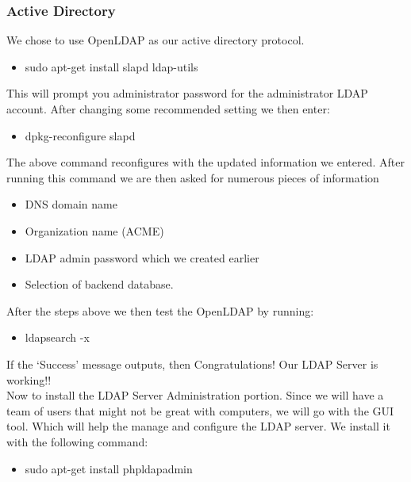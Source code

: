 \subsubsection{Active Directory}
We chose to use OpenLDAP as our active directory protocol.

\begin{itemize}
	
	\item sudo apt-get install slapd ldap-utils
	
\end{itemize}

\noindent This will prompt you administrator password for the administrator LDAP 
account.
After changing some recommended setting we then enter:

\begin{itemize}
	\item dpkg-reconfigure slapd
\end{itemize}

\noindent The above command reconfigures with the updated information we entered. After 
running this command we are then asked for numerous pieces of information

\begin{itemize}
	\item DNS domain name
	\item Organization name (ACME)
	\item LDAP admin password which we created earlier
	\item Selection of backend database. 
\end{itemize}

\noindent After the steps above we then test the OpenLDAP by running:

\begin{itemize}
	\item ldapsearch -x
\end{itemize}

\noindent If the ‘Success’ message outputs, then Congratulations! Our LDAP 
Server is working!! \\

\noindent Now to install the LDAP Server Administration portion. Since we will 
have a team of users that might not be great with computers, we will go with
the GUI tool. Which will help the manage and configure the LDAP server.
We install it with the following command:

\begin{itemize}
	\item sudo apt-get install phpldapadmin
\end{itemize}

